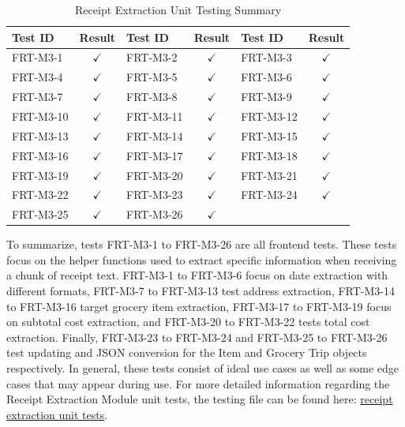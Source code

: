 \documentclass[12pt, titlepage]{article}
\begin{document}
\begin{longtable}{|l|c|l|c|l|c|}
  \caption{Receipt Extraction Unit Testing Summary} \label{Receipt Extraction Unit Test Summary} \\
  \toprule
  \textbf{Test ID} & \textbf{Result} & \textbf{Test ID} & \textbf{Result} & \textbf{Test ID} & \textbf{Result} \\
  \midrule
  FRT-M3-1 & $\checkmark$ & FRT-M3-2 & $\checkmark$ & FRT-M3-3 & $\checkmark$ \\
  \midrule
  FRT-M3-4 & $\checkmark$ & FRT-M3-5 & $\checkmark$ & FRT-M3-6 & $\checkmark$ \\
  \midrule
  FRT-M3-7 & $\checkmark$ & FRT-M3-8 & $\checkmark$ & FRT-M3-9 & $\checkmark$ \\
  \midrule
  FRT-M3-10 & $\checkmark$ & FRT-M3-11 & $\checkmark$ & FRT-M3-12 & $\checkmark$ \\
  \midrule
  FRT-M3-13 & $\checkmark$ & FRT-M3-14 & $\checkmark$ & FRT-M3-15 & $\checkmark$ \\
  \midrule
  FRT-M3-16 & $\checkmark$ & FRT-M3-17 & $\checkmark$ & FRT-M3-18 & $\checkmark$ \\
  \midrule
  FRT-M3-19 & $\checkmark$ & FRT-M3-20 & $\checkmark$ & FRT-M3-21 & $\checkmark$ \\
  \midrule
  FRT-M3-22 & $\checkmark$ & FRT-M3-23 & $\checkmark$ & FRT-M3-24 & $\checkmark$ \\
  \midrule
  FRT-M3-25 & $\checkmark$ & FRT-M3-26 & $\checkmark$ & ~ & ~ \\
  \bottomrule
\end{longtable}

To summarize, tests FRT-M3-1 to FRT-M3-26 are all frontend tests. These tests focus on the helper functions used
to extract specific information when receiving a chunk of receipt text. FRT-M3-1 to FRT-M3-6 focus on date
extraction with different formats, FRT-M3-7 to FRT-M3-13 test address extraction, FRT-M3-14 to FRT-M3-16 target grocery item extraction,
FRT-M3-17 to FRT-M3-19 focus on subtotal cost extraction, and FRT-M3-20 to FRT-M3-22 tests total cost extraction.
Finally, FRT-M3-23 to FRT-M3-24 and FRT-M3-25 to FRT-M3-26 test updating and JSON conversion for the Item and Grocery Trip
objects respectively. In general, these
tests consist of ideal use cases as well as some edge cases that may appear during use.
For more detailed information regarding the Receipt Extraction Module unit tests, the testing file
can be found here: \href{https://github.com/allanfang1/grocery_spending_tracker_app/blob/main/test/receipt_extraction_test.dart}{receipt extraction
unit tests}.
\end{document}

